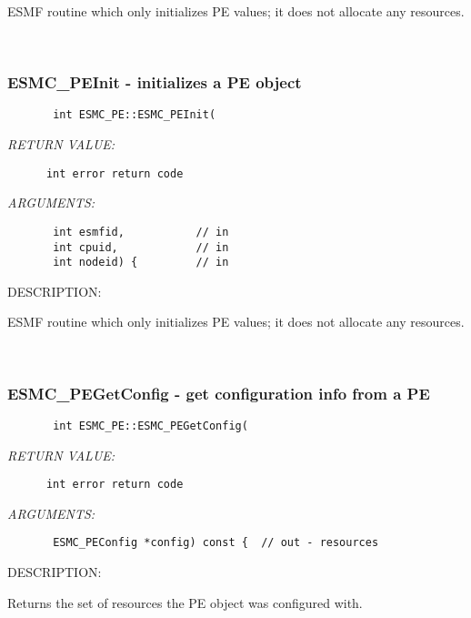         ESMF routine which only initializes PE values; it does not
        allocate any resources.
   
 
\mbox{}\hrulefill\ 
 
\subsubsection{ESMC\_PEInit - initializes a PE object}


  
\begin{verbatim}       int ESMC_PE::ESMC_PEInit(\end{verbatim}{\em RETURN VALUE:}
\begin{verbatim}      int error return code\end{verbatim}{\em ARGUMENTS:}
\begin{verbatim}       int esmfid,           // in
       int cpuid,            // in
       int nodeid) {         // in\end{verbatim}
{\sf DESCRIPTION:\\ }


        ESMF routine which only initializes PE values; it does not
        allocate any resources.
   
 
\mbox{}\hrulefill\ 
 
\subsubsection{ESMC\_PEGetConfig - get configuration info from a PE}


  
\begin{verbatim}       int ESMC_PE::ESMC_PEGetConfig(\end{verbatim}{\em RETURN VALUE:}
\begin{verbatim}      int error return code\end{verbatim}{\em ARGUMENTS:}
\begin{verbatim}       ESMC_PEConfig *config) const {  // out - resources\end{verbatim}
{\sf DESCRIPTION:\\ }


      Returns the set of resources the PE object was configured with.
   
